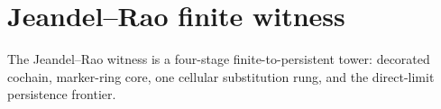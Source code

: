 \section{Jeandel--Rao finite witness}

The Jeandel--Rao witness is a four-stage finite-to-persistent tower: decorated
cochain, marker-ring core, one cellular substitution rung, and the direct-limit
persistence frontier.





